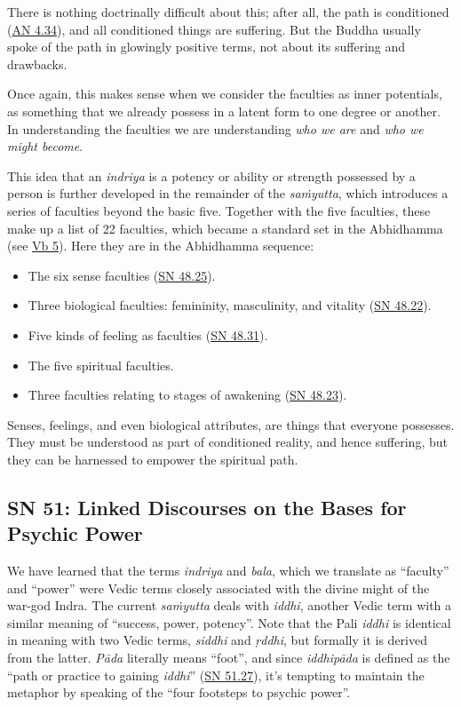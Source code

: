 \documentclass[12pt,openany]{book}%
\begin{document}
There is nothing doctrinally difficult about this; after all, the path is conditioned (\href{https://suttacentral.net/an4.34}{AN 4.34}), and all conditioned things are suffering. But the Buddha usually spoke of the path in glowingly positive terms, not about its suffering and drawbacks.

Once again, this makes sense when we consider the faculties as inner potentials, as something that we already possess in a latent form to one degree or another. In understanding the faculties we are understanding \emph{who we are} and \emph{who we might become}.

This idea that an \textit{indriya} is a potency or ability or strength possessed by a person is further developed in the remainder of the \textit{\textsanskrit{saṁyutta}}, which introduces a series of faculties beyond the basic five. Together with the five faculties, these make up a list of 22 faculties, which became a standard set in the Abhidhamma (see \href{https://suttacentral.net/vb5}{Vb 5}). Here they are in the Abhidhamma sequence:

\begin{itemize}%
\item The six sense faculties (\href{https://suttacentral.net/sn48.25}{SN 48.25}).%
\item Three biological faculties: femininity, masculinity, and vitality (\href{https://suttacentral.net/sn48.22}{SN 48.22}).%
\item Five kinds of feeling as faculties (\href{https://suttacentral.net/sn48.31}{SN 48.31}).%
\item The five spiritual faculties.%
\item Three faculties relating to stages of awakening (\href{https://suttacentral.net/sn48.23}{SN 48.23}).%
\end{itemize}

Senses, feelings, and even biological attributes, are things that everyone possesses. They must be understood as part of conditioned reality, and hence suffering, but they can be harnessed to empower the spiritual path.

\subsection*{SN 51: Linked Discourses on the Bases for Psychic Power}

We have learned that the terms \textit{indriya} and \textit{bala}, which we translate as “faculty” and “power” were Vedic terms closely associated with the divine might of the war-god Indra. The current \textit{\textsanskrit{saṁyutta}} deals with \textit{iddhi}, another Vedic term with a similar meaning of “success, power, potency”. Note that the Pali \textit{iddhi} is identical in meaning with two Vedic terms, \textit{siddhi} and \textit{\textsanskrit{ṛddhi}}, but formally it is derived from the latter. \textit{\textsanskrit{Pāda}} literally means “foot”, and since \textit{\textsanskrit{iddhipāda}} is defined as the “path or practice to gaining \textit{iddhi}” (\href{https://suttacentral.net/sn51.27}{SN 51.27}), it’s tempting to maintain the metaphor by speaking of the “four footsteps to psychic power”.
\end{document}
